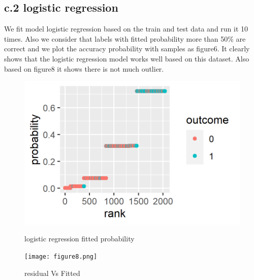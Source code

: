 \documentclass[a4paper, 11pt]{article}
\begin{document}
\subsection*{c.2 logistic regression }
We fit model logistic regression based on the train and test data and run it 10 times. Also we consider that labels with fitted probability more than 50\% are correct and we plot the accuracy probability with samples as figure6. It clearly shows that the logistic regression model works well based on this dataset. Also based on figure8 it shows there is not much outlier. 

\begin{figure}[H]
	\begin{minipage}{0.5\textwidth}
	\centering
	\includegraphics[width = \textwidth]{figure7.png}
	\caption{logistic regression fitted probability}
	\label{Figure6}
	\end{minipage}
	\begin{minipage}{0.5\textwidth}
	\centering
	\texttt{[image: figure8.png]}
	\caption{residual Vs Fitted}
	\label{Figure8}
\end{minipage}
\end{figure}
\end{document}
